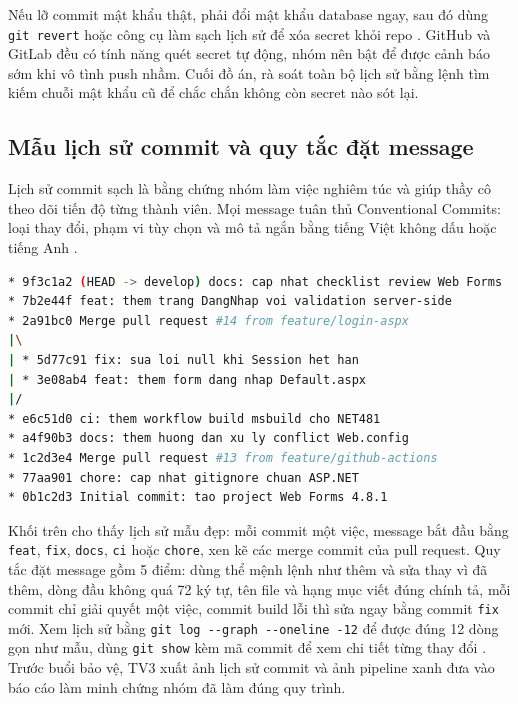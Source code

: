 Nếu lỡ commit mật khẩu thật, phải đổi mật khẩu database ngay, sau đó dùng \verb|git revert| hoặc công cụ làm sạch lịch sử để xóa secret khỏi repo \cite{progit,githubdocs,gitlabdocs}.
GitHub và GitLab đều có tính năng quét secret tự động, nhóm nên bật để được cảnh báo sớm khi vô tình push nhầm.
Cuối đồ án, rà soát toàn bộ lịch sử bằng lệnh tìm kiếm chuỗi mật khẩu cũ để chắc chắn không còn secret nào sót lại.

\subsection{Mẫu lịch sử commit và quy tắc đặt message}
\label{subsec:c7-log}

Lịch sử commit sạch là bằng chứng nhóm làm việc nghiêm túc và giúp thầy cô theo dõi tiến độ từng thành viên.
Mọi message tuân thủ Conventional Commits: loại thay đổi, phạm vi tùy chọn và mô tả ngắn bằng tiếng Việt không dấu hoặc tiếng Anh \cite{convcommits}.

\begin{lstlisting}[language=bash, caption={Mau lich su commit dep cho repo do an ASPX}, label={lst:c7-log}]
* 9f3c1a2 (HEAD -> develop) docs: cap nhat checklist review Web Forms
* 7b2e44f feat: them trang DangNhap voi validation server-side
* 2a91bc0 Merge pull request #14 from feature/login-aspx
|\
| * 5d77c91 fix: sua loi null khi Session het han
| * 3e08ab4 feat: them form dang nhap Default.aspx
|/
* e6c51d0 ci: them workflow build msbuild cho NET481
* a4f90b3 docs: them huong dan xu ly conflict Web.config
* 1c2d3e4 Merge pull request #13 from feature/github-actions
* 77aa901 chore: cap nhat gitignore chuan ASP.NET
* 0b1c2d3 Initial commit: tao project Web Forms 4.8.1
\end{lstlisting}

Khối trên cho thấy lịch sử mẫu đẹp: mỗi commit một việc, message bắt đầu bằng \verb|feat|, \verb|fix|, \verb|docs|, \verb|ci| hoặc \verb|chore|, xen kẽ các merge commit của pull request.
Quy tắc đặt message gồm 5 điểm: dùng thể mệnh lệnh như thêm và sửa thay vì đã thêm, dòng đầu không quá 72 ký tự, tên file và hạng mục viết đúng chính tả, mỗi commit chỉ giải quyết một việc, commit build lỗi thì sửa ngay bằng commit \verb|fix| mới.
Xem lịch sử bằng \verb|git log --graph --oneline -12| để được đúng 12 dòng gọn như mẫu, dùng \verb|git show| kèm mã commit để xem chi tiết từng thay đổi \cite{progit}.
Trước buổi bảo vệ, TV3 xuất ảnh lịch sử commit và ảnh pipeline xanh đưa vào báo cáo làm minh chứng nhóm đã làm đúng quy trình.

